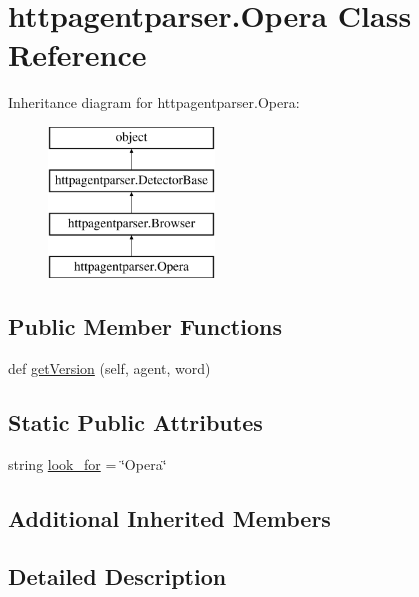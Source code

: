 \hypertarget{classhttpagentparser_1_1_opera}{}\section{httpagentparser.\+Opera Class Reference}
\label{classhttpagentparser_1_1_opera}
Inheritance diagram for httpagentparser.\+Opera\+:\begin{figure}[H]
\begin{center}
\leavevmode
\includegraphics[height=4.000000cm]{classhttpagentparser_1_1_opera}
\end{center}
\end{figure}
\subsection*{Public Member Functions}
\begin{DoxyCompactItemize}
\item 
def \hyperlink{classhttpagentparser_1_1_opera_a58e4d1290d7e259160b5161dd0049983}{get\+Version} (self, agent, word)
\end{DoxyCompactItemize}
\subsection*{Static Public Attributes}
\begin{DoxyCompactItemize}
\item 
string \hyperlink{classhttpagentparser_1_1_opera_a0320f569a76d967cb09efda1885499a5}{look\+\_\+for} = \char`\"{}Opera\char`\"{}
\end{DoxyCompactItemize}
\subsection*{Additional Inherited Members}


\subsection{Detailed Description}


